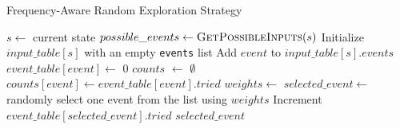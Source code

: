 \documentclass{article}
\begin{document}
\begin{algorithm}
\caption{Frequency-Aware Random Exploration Strategy}
\begin{algorithmic}[1]
\State $s \gets$ current state
    \State $possible\_events \gets \Call{GetPossibleInputs}{s}$
    \State Initialize $input\_table[s]$ with an empty \texttt{events} list
        \State Add $event$ to $input\_table[s].events$
            \State $event\_table[event] \gets$ 0
        \EndIf
    \EndFor
\EndIf
    \State $counts$ $\gets$ $\emptyset$
        \State $counts[event] \gets event\_table[event].tried$
    \EndFor
    \State $weights \gets$ 
    \State $selected\_event \gets$ randomly select one event from the list using $weights$
    \State Increment $event\_table[selected\_event].tried$
    \State \Return $selected\_event$
\EndFunction
\end{algorithmic}
\end{algorithm}
\end{document}

